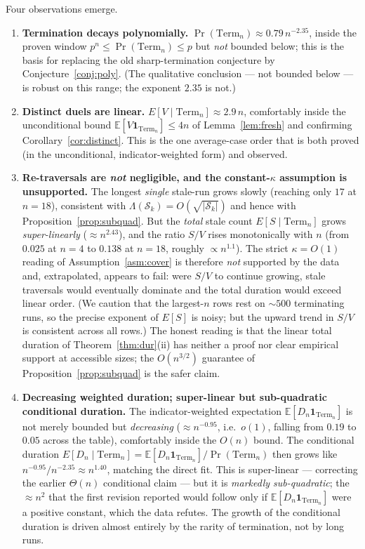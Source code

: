 \documentclass[11pt]{article}
\theoremstyle{definition}
\theoremstyle{remark}
\newcommand{\Term}{\mathrm{Term}}
\newcommand{\E}{\mathbb{E}}
\begin{document}
Four observations emerge.
\begin{enumerate}[leftmargin=1.6em]
\item \textbf{Termination decays polynomially.} $\Pr(\Term_n) \approx 0.79\, n^{-2.35}$, inside the proven window
$p^n \le \Pr(\Term_n) \le p$ but \emph{not} bounded below; this is the basis for replacing the old sharp-termination
conjecture by Conjecture~\ref{conj:poly}. (The qualitative conclusion --- not bounded below --- is robust on this range;
the exponent $2.35$ is not.)

\item \textbf{Distinct duels are linear.} $E[V \mid \Term_n] \approx 2.9\, n$, comfortably inside the unconditional bound
$\E[V \mathbf 1_{\Term_n}] \le 4n$ of Lemma~\ref{lem:fresh} and confirming Corollary~\ref{cor:distinct}. This is the one
average-case order that is both proved (in the unconditional, indicator-weighted form) and observed.

\item \textbf{Re-traversals are \emph{not} negligible, and the constant-$\kappa$ assumption is unsupported.} The longest
\emph{single} stale-run grows slowly (reaching only $17$ at $n = 18$), consistent with
$\Lambda(\mathcal S_k) = O(\sqrt{|\mathcal S_k|})$ and hence with Proposition~\ref{prop:subquad}. But the \emph{total}
stale count $E[S \mid \Term_n]$ grows \emph{super-linearly} ($\approx n^{2.43}$), and the ratio $S/V$ rises
monotonically with $n$ (from $0.025$ at $n = 4$ to $0.138$ at $n = 18$, roughly $\propto n^{1.1}$). The strict
$\kappa = O(1)$ reading of Assumption~\ref{asm:cover} is therefore \emph{not} supported by the data and, extrapolated,
appears to fail: were $S/V$ to continue growing, stale traversals would eventually dominate and the total duration would
exceed linear order. (We caution that the largest-$n$ rows rest on $\sim 500$ terminating runs, so the precise exponent of
$E[S]$ is noisy; but the upward trend in $S/V$ is consistent across all rows.) The honest reading is that the linear total
duration of Theorem~\ref{thm:dur}(ii) has neither a proof nor clear empirical support at accessible sizes; the
$O(n^{3/2})$ guarantee of Proposition~\ref{prop:subquad} is the safer claim.

\item \textbf{Decreasing weighted duration; super-linear but sub-quadratic conditional duration.} The indicator-weighted
expectation $\E[D_n \mathbf 1_{\Term_n}]$ is not merely bounded but \emph{decreasing} ($\approx n^{-0.95}$, i.e.\ $o(1)$,
falling from $0.19$ to $0.05$ across the table), comfortably inside the $O(n)$ bound. The conditional duration
$E[D_n \mid \Term_n] = \E[D_n \mathbf 1_{\Term_n}] / \Pr(\Term_n)$ then grows like $n^{-0.95} / n^{-2.35} \approx n^{1.40}$,
matching the direct fit. This is super-linear --- correcting the earlier $\Theta(n)$ conditional claim --- but it is
\emph{markedly sub-quadratic}; the $\approx n^2$ that the first revision reported would follow only if
$\E[D_n \mathbf 1_{\Term_n}]$ were a positive constant, which the data refutes. The growth of the conditional duration is
driven almost entirely by the rarity of termination, not by long runs.
\end{enumerate}
\end{document}
